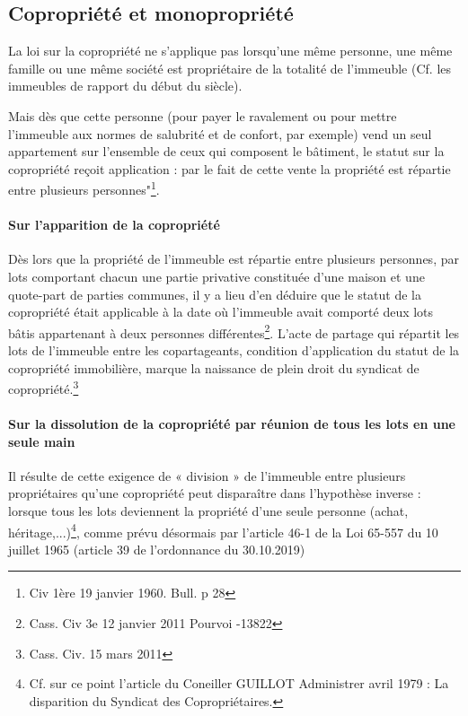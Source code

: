 	\subsection{Copropriété et monopropriété}
	
		La loi sur la copropriété ne s'applique pas lorsqu'une même personne, une même famille ou une même
		société est propriétaire de la totalité de l'immeuble (Cf. les immeubles de rapport du début du siècle).
		
		Mais dès que cette personne (pour payer le ravalement ou pour mettre l'immeuble aux normes de
		salubrité et de confort, par exemple) vend un seul appartement sur l'ensemble de ceux qui composent le
		bâtiment, le statut sur la copropriété reçoit application : par le fait de cette vente la propriété est répartie
		entre plusieurs personnes"\footnote{Civ 1ère 19 janvier 1960. Bull.  p 28}.
		
		\paragraph{Sur l’apparition de la copropriété}
		Dès lors que la propriété de l'immeuble est répartie entre plusieurs personnes, par lots comportant chacun
		une partie privative constituée d'une maison et une quote-part de parties communes, il y a lieu d'en
		déduire que le statut de la copropriété était applicable à la date où l'immeuble avait comporté deux lots
		bâtis appartenant à deux personnes différentes\footnote{Cass. Civ 3e 12 janvier 2011 Pourvoi -13822}.
		L’acte de partage qui répartit les lots de l’immeuble entre les copartageants, condition d’application du
		statut de la copropriété immobilière, marque la naissance de plein droit du syndicat de copropriété.\footnote{
		Cass. Civ. 15 mars 2011	}%
	
		\paragraph{Sur la dissolution de la copropriété par réunion de tous les lots en une seule main}
		Il résulte de cette exigence de « division » de l’immeuble entre plusieurs propriétaires qu’une copropriété
		peut disparaître dans l'hypothèse inverse : lorsque tous les lots deviennent la propriété d'une seule
		personne (achat, héritage,...)\footnote{
		Cf. sur ce point l'article du Coneiller GUILLOT Administrer avril 1979 : La disparition du Syndicat des Copropriétaires.
		}, comme prévu désormais par l’article 46-1 de la Loi 65-557 du 10 juillet
		1965 (article 39 de l’ordonnance du 30.10.2019)%
	

